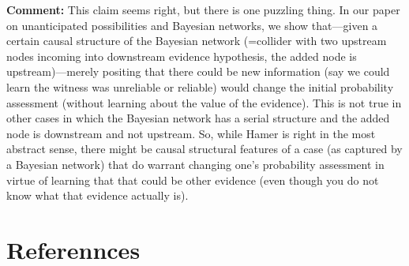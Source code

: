 \documentclass[
  10pt,
  dvipsnames,enabledeprecatedfontcommands]{scrartcl}
\begin{document}
\textbf{Comment:} This claim seems right, but there is one puzzling
thing. In our paper on unanticipated possibilities and Bayesian
networks, we show that---given a certain causal structure of the
Bayesian network (=collider with two upstream nodes incoming into
downstream evidence hypothesis, the added node is upstream)---merely
positing that there could be new information (say we could learn the
witness was unreliable or reliable) would change the initial probability
assessment (without learning about the value of the evidence). This is
not true in other cases in which the Bayesian network has a serial
structure and the added node is downstream and not upstream. So, while
Hamer is right in the most abstract sense, there might be causal
structural features of a case (as captured by a Bayesian network) that
do warrant changing one's probability assessment in virtue of learning
that that could be other evidence (even though you do not know what that
evidence actually is).

\hypertarget{referennces}{%
\section{Referennces}\label{referennces}}
\end{document}
